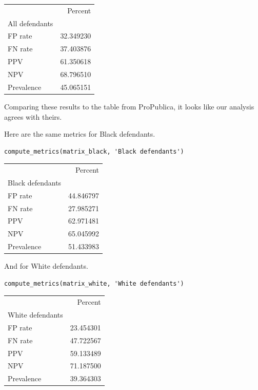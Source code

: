 \begin{tabular}{lr}
\midrule
{} &    Percent \\
All defendants &            \\
\midrule
FP rate        &  32.349230 \\
FN rate        &  37.403876 \\
PPV            &  61.350618 \\
NPV            &  68.796510 \\
Prevalence     &  45.065151 \\
\midrule
\end{tabular}

Comparing these results to the table from ProPublica, it looks like our
analysis agrees with theirs.

Here are the same metrics for Black defendants.

\begin{lstlisting}[]
compute_metrics(matrix_black, 'Black defendants')
\end{lstlisting}

\begin{tabular}{lr}
\midrule
{} &    Percent \\
Black defendants &            \\
\midrule
FP rate          &  44.846797 \\
FN rate          &  27.985271 \\
PPV              &  62.971481 \\
NPV              &  65.045992 \\
Prevalence       &  51.433983 \\
\midrule
\end{tabular}

And for White defendants.

\begin{lstlisting}[]
compute_metrics(matrix_white, 'White defendants')
\end{lstlisting}

\begin{tabular}{lr}
\midrule
{} &    Percent \\
White defendants &            \\
\midrule
FP rate          &  23.454301 \\
FN rate          &  47.722567 \\
PPV              &  59.133489 \\
NPV              &  71.187500 \\
Prevalence       &  39.364303 \\
\midrule
\end{tabular}

